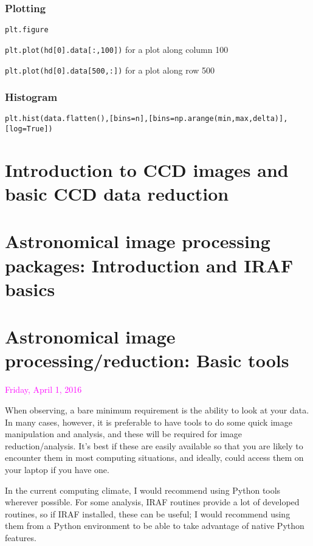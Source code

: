 \documentclass[12pt]{article}
\begin{document}
\subsubsection*{Plotting}
\begin{itemize*}
    \item \texttt{plt.figure}
    \item \texttt{plt.plot(hd[0].data[:,100])} for a plot along column 100
    \item \texttt{plt.plot(hd[0].data[500,:])} for a plot along row 500
\end{itemize*}

\subsubsection*{Histogram}
\texttt{plt.hist(data.flatten(),[bins=n],[bins=np.arange(min,max,delta)],
[log=True])}

\section*{Introduction to CCD images and basic CCD data reduction}
\section*{Astronomical image processing packages: Introduction and IRAF basics}
\section*{Astronomical image processing/reduction: Basic tools}
\textcolor{magenta}{Friday, April 1, 2016}

When observing, a bare minimum requirement is the ability to look at
your data. In many cases, however, it is preferable to have tools to
do some quick image manipulation and analysis, and these will be
required for image reduction/analysis. It's best if these are easily
available so that you are likely to encounter them in most computing
situations, and ideally, could access them on your laptop if you have
one.

In the current computing climate, I would recommend using Python tools
wherever possible. For some analysis, IRAF routines provide a lot of
developed routines, so if IRAF installed, these can be useful; I would
recommend using them from a Python environment to be able to take
advantage of native Python features.
\end{document}
